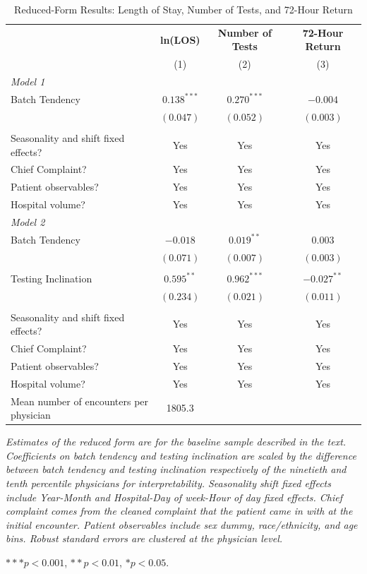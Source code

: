 \documentclass[,,nonblindrev]{informs}
\begin{document}
\begin{table}[htbp]
\centering
\caption{Reduced-Form Results: Length of Stay, Number of Tests, and 72-Hour Return}
\label{tab:reducedform}
\begin{tabular}{p{6cm}ccc}
\toprule
& \multicolumn{1}{c}{\textbf{ln(LOS)}}
& \multicolumn{1}{c}{\textbf{Number of Tests}}
& \multicolumn{1}{c}{\textbf{72-Hour Return}} \\
& \multicolumn{1}{c}{(1)}
& \multicolumn{1}{c}{(2)}
& \multicolumn{1}{c}{(3)} \\
\midrule
\textit{Model 1} & & & \\
Batch Tendency      & $0.138^{***}$ & $0.270^{***}$ & $-0.004$  \\
                    & $(0.047)$  & $(0.052)$     & $(0.003)$ \\
\\
Seasonality and shift fixed effects? & Yes & Yes & Yes \\
Chief Complaint? & Yes & Yes & Yes \\
Patient observables? & Yes & Yes & Yes \\
Hospital volume? & Yes & Yes & Yes \\
\midrule
\midrule
\textit{Model 2} & & & \\
Batch Tendency      & $-0.018$      & $0.019^{**}$ & $0.003$   \\
                    & $(0.071)$     & $(0.007)$     & $(0.003)$ \\
                    &     &     &  \\
Testing Inclination    & $0.595^{**}$  & $0.962^{***}$ & $-0.027^{**}$ \\
                    & $(0.234)$  & $(0.021)$     & $(0.011)$ \\
\\
Seasonality and shift fixed effects? & Yes & Yes & Yes \\
Chief Complaint? & Yes & Yes & Yes \\
Patient observables? & Yes & Yes & Yes \\
Hospital volume? & Yes & Yes & Yes \\
\midrule
Mean number of encounters per physician & 1805.3 &  &  \\
\midrule
\bottomrule
\end{tabular}
\begin{tablenotes}
\tiny
\item \textit{Estimates of the reduced form are for the baseline sample described in the text. Coefficients on batch tendency and testing inclination are scaled by the difference between batch tendency and testing inclination respectively of the ninetieth and tenth percentile physicians for interpretability. Seasonality shift fixed effects include Year-Month and Hospital-Day of week-Hour of day fixed effects. Chief complaint comes from the cleaned complaint that the patient came in with at the initial encounter. Patient observables include sex dummy, race/ethnicity, and age bins. Robust standard errors are clustered at the physician level.}
\item $*** p < 0.001$, $** p < 0.01$, $* p < 0.05$.
\end{tablenotes}
\end{table}
\end{document}
